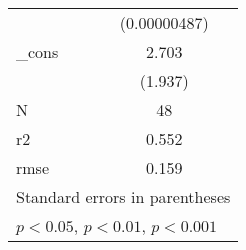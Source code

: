 {\begin{tabular}{l*{1}{c}}
            &(0.00000487)         \\
[1em]
\_cons      &       2.703         \\
            &     (1.937)         \\
\hline
N           &          48         \\
r2          &       0.552         \\
rmse        &       0.159         \\
\hline\hline
\multicolumn{2}{l}{\footnotesize Standard errors in parentheses}\\
\multicolumn{2}{l}{\footnotesize \sym{*} \(p<0.05\), \sym{**} \(p<0.01\), \sym{***} \(p<0.001\)}\\
\end{tabular}
}
